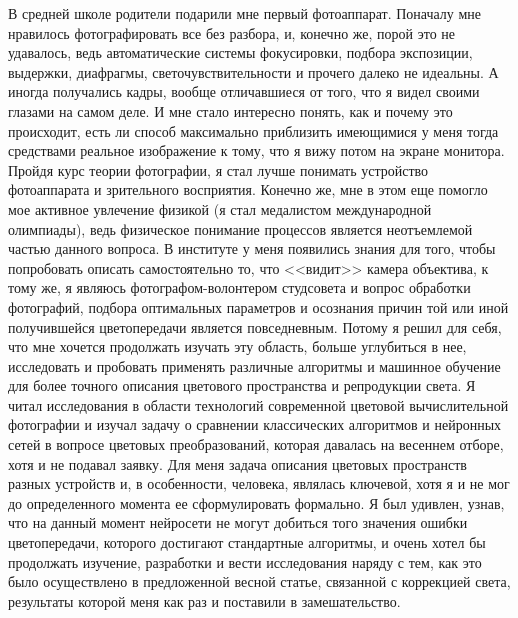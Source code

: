 \quad В средней школе родители подарили мне первый фотоаппарат. Поначалу мне нравилось фотографировать все без разбора, и, конечно же, порой
это не удавалось, ведь автоматические системы фокусировки, подбора экспозиции, выдержки, диафрагмы, светочувствительности и прочего далеко не
идеальны. А иногда получались кадры, вообще отличавшиеся от того, что я видел своими глазами на самом деле. И мне стало интересно понять, как
и почему это происходит, есть ли способ максимально приблизить имеющимися у меня тогда средствами реальное изображение к тому, что я вижу потом
на экране монитора. Пройдя курс теории фотографии, я стал лучше понимать устройство фотоаппарата и зрительного восприятия. Конечно же, мне в
этом еще помогло мое активное увлечение физикой (я стал медалистом международной олимпиады), ведь физическое понимание процессов является
неотъемлемой частью данного вопроса. В институте у меня появились знания для того, чтобы попробовать описать самостоятельно то, что <<видит>>
камера объектива, к тому же, я являюсь фотографом-волонтером студсовета и вопрос обработки фотографий, подбора оптимальных параметров и
осознания причин той или иной получившейся цветопередачи является повседневным. Потому я решил для себя, что мне хочется продолжать изучать эту
область, больше углубиться в нее, исследовать и пробовать применять различные алгоритмы и машинное обучение для более точного описания
цветового пространства и репродукции света. Я читал исследования в области технологий современной цветовой вычислительной фотографии и изучал
задачу о сравнении классических алгоритмов и нейронных сетей в вопросе цветовых преобразований, которая давалась на весеннем отборе, хотя и не
подавал заявку. Для меня задача описания цветовых пространств разных устройств и, в особенности, человека, являлась ключевой, хотя я и не мог
до определенного момента ее сформулировать формально. Я был удивлен, узнав, что на данный момент нейросети не могут добиться того значения
ошибки цветопередачи, которого достигают стандартные алгоритмы, и очень хотел бы продолжать изучение, разработки и вести исследования наряду с
тем, как это было осуществлено в предложенной весной статье, связанной с коррекцией света, результаты которой меня как раз и поставили в
замешательство.

